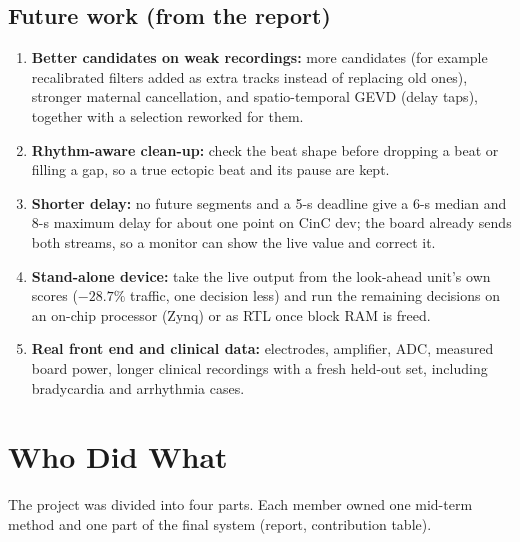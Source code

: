\documentclass[11pt]{article}
\begin{document}
\subsection{Future work (from the report)}
\begin{enumerate}
  \item \textbf{Better candidates on weak recordings:} more candidates (for example recalibrated filters added as extra tracks instead of replacing old ones), stronger maternal cancellation, and spatio-temporal GEVD (delay taps), together with a selection reworked for them.
  \item \textbf{Rhythm-aware clean-up:} check the beat shape before dropping a beat or filling a gap, so a true ectopic beat and its pause are kept.
  \item \textbf{Shorter delay:} no future segments and a 5-s deadline give a 6-s median and 8-s maximum delay for about one point on CinC dev; the board already sends both streams, so a monitor can show the live value and correct it.
  \item \textbf{Stand-alone device:} take the live output from the look-ahead unit's own scores ($-28.7\%$ traffic, one decision less) and run the remaining decisions on an on-chip processor (Zynq) or as RTL once block RAM is freed.
  \item \textbf{Real front end and clinical data:} electrodes, amplifier, ADC, measured board power, longer clinical recordings with a fresh held-out set, including bradycardia and arrhythmia cases.
\end{enumerate}

\section{Who Did What}
\label{sec:who}
The project was divided into four parts. Each member owned one mid-term method and one part of the final system (report, contribution table).
\end{document}
